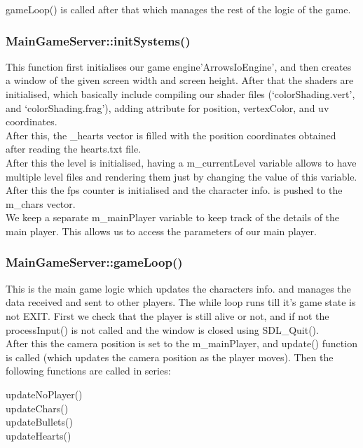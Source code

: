 \documentclass{article}
\begin{document}
gameLoop() is called after that which manages the rest of the logic of the game.
\newline

\subsubsection{MainGameServer::initSystems() }
This function first initialises our game engine’ArrowsIoEngine’, and then creates a window of the given screen width and screen height. After that the shaders are initialised, which basically include compiling our shader files (‘colorShading.vert’, and ‘colorShading.frag’), adding attribute for position, vertexColor, and uv coordinates. \\

After this, the \_hearts vector is filled with the position coordinates obtained after reading the hearts.txt file. \\

After this the level is initialised, having a m\_currentLevel variable allows to have multiple level files and rendering them just by changing the value of this variable. After this the fps counter is initialised and the character info. is pushed to the m\_chars vector. \\

We keep a separate m\_mainPlayer variable to keep track of the details of the main player. This allows us to access the parameters of our main player.
\newline

\subsubsection{MainGameServer::gameLoop() }

This is the main game logic which updates the characters info. and manages the data received and sent to other players. The while loop runs till it’s game state is not EXIT. First we check that the player is still alive or not, and if not the processInput() is not called and the window is closed using SDL\_Quit(). \\

After this the camera position is set to the m\_mainPlayer, and update() function is called (which updates the camera position as the player moves). Then the following functions are called in series:
\newline

updateNoPlayer() \\
updateChars() \\
updateBullets() \\
updateHearts() \\
\end{document}
